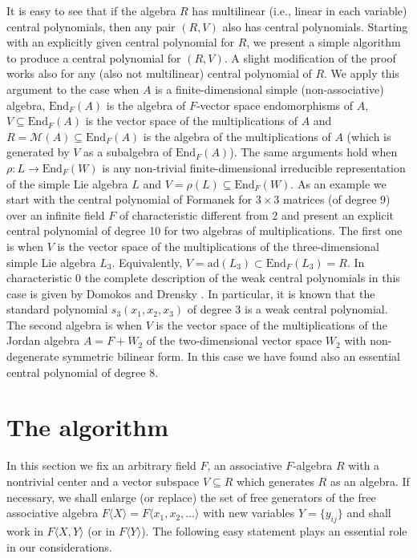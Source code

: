 \documentclass[10]{amsart}
\theoremstyle{definition}
\begin{document}
It is easy to see that if the algebra $R$ has multilinear (i.e., linear in each variable) central polynomials, then
any pair $(R,V)$ also has central polynomials. Starting with an explicitly given central polynomial for $R$, we present a simple algorithm to produce
a central polynomial for $(R,V)$. A slight modification of the proof works also for any (also not multilinear) central polynomial of $R$.
We apply this argument to the case when $A$ is a finite-dimensional simple (non-associative) algebra, $\text{End}_F(A)$
is the algebra of $F$-vector space endomorphisms of $A$, $V\subseteq \text{End}_F(A)$ is the vector space of the multiplications of $A$
and $R={\mathcal M}(A)\subseteq \text{End}_F(A)$ is the algebra of the multiplications of $A$ (which is generated by $V$ as a subalgebra of $\text{End}_F(A)$).
The same arguments hold when $\rho:L\to \text{End}_F(W)$ is any non-trivial finite-dimensional irreducible representation of the simple Lie algebra $L$
and $V=\rho(L)\subseteq\text{End}_F(W)$.
As an example we start with the central polynomial of Formanek \cite{F1} for $3\times 3$ matrices
(of degree 9) over an infinite field $F$ of characteristic different from 2
and present an explicit central polynomial of degree 10 for two algebras of multiplications.
The first one is when $V$ is the vector space of the multiplications of the three-dimensional simple Lie algebra $L_3$.
Equivalently, $V=\text{ad}(L_3)\subset \text{End}_F(L_3)=R$.
In characteristic 0 the complete description of the weak central polynomials in this case is given by Domokos and Drensky \cite{DoD}.
In particular, it is known that the standard polynomial $s_3(x_1,x_2,x_3)$ of degree 3 is a weak central polynomial.
The second algebra is when $V$ is the vector space of the multiplications of the Jordan algebra $A=F+W_2$ of the two-dimensional vector space $W_2$
with non-degenerate symmetric bilinear form. In this case we have found also an essential central polynomial of degree 8.

\section{The algorithm}
In this section we fix an arbitrary field $F$, an associative $F$-algebra $R$ with a nontrivial center and a vector subspace $V\subseteq R$
which generates $R$ as an algebra. If necessary, we shall enlarge (or replace) the set of free generators of the free associative algebra
$F\langle X\rangle=F\langle x_1,x_2,\ldots\rangle$ with new variables $Y=\{y_{ij}\}$ and shall work in $F\langle X,Y\rangle$ (or in $F\langle Y\rangle$).
The following easy statement plays an essential role in our considerations.
\end{document}

